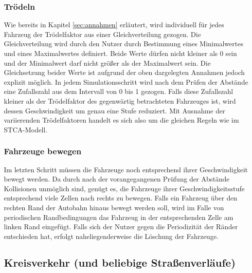 \documentclass[11pt, a4paper]{article}
\begin{document}
\subsubsection{Trödeln}
\label{subsubsec:troedeln}

Wie bereits in Kapitel \ref{sec:annahmen} erläutert, wird individuell für jedes Fahrzeug der Trödelfaktor aus einer Gleichverteilung gezogen. Die Gleichverteilung wird durch den Nutzer durch Bestimmung eines Minimalwertes und eines Maximalwertes definiert. Beide Werte dürfen nicht kleiner als 0 sein und der Minimalwert darf nicht größer als der Maximalwert sein. Die Gleichsetzung beider Werte ist aufgrund der oben dargelegten Annahmen jedoch explizit möglich. In jedem Simulationsschritt wird nach dem Prüfen der Abstände eine Zufallszahl aus dem Intervall von 0 bis 1 gezogen. Falls diese Zufallszahl kleiner als der Trödelfaktor des gegenwärtig betrachteten Fahrzeuges ist, wird dessen Geschwindigkeit um genau eine Stufe reduziert. Mit Ausnahme der variierenden Trödelfaktoren handelt es sich also um die gleichen Regeln wie im STCA-Modell.

\subsubsection{Fahrzeuge bewegen}
\label{subsubsec:fahrzeugeBewegen}

Im letzten Schritt müssen die Fahrzeuge noch entsprechend ihrer Geschwindigkeit bewegt werden. Da durch nach der vorangegangenen Prüfung der Abstände Kollisionen unmöglich sind, genügt es, die Fahrzeuge ihrer Geschwindigkeitsstufe entsprechend viele Zellen nach rechts zu bewegen. Falls ein Fahrzeug über den rechten Rand der Autobahn hinaus bewegt werden soll, wird im Falle von periodischen Randbedingungen das Fahrzeug in der entsprechenden Zelle am linken Rand eingefügt. Falls sich der Nutzer gegen die Periodizität der Ränder entschieden hat, erfolgt naheliegenderweise die Löschung der Fahrzeuge. 

\subsection{Kreisverkehr (und beliebige Straßenverläufe)}
\label{subsec:umsetzung-kreisverkehr}
\end{document}
